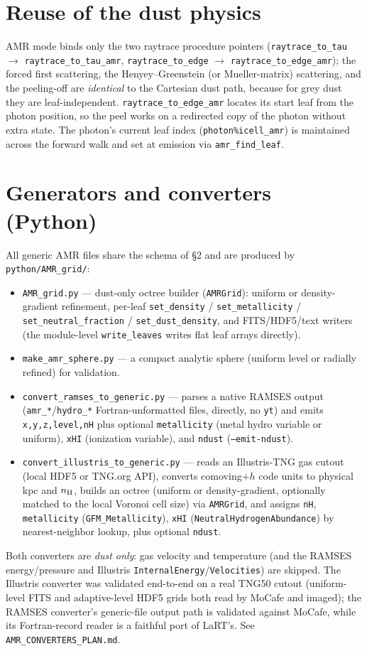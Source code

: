\documentclass[english,a4paper]{kiseon_memo}
\begin{document}
\section{Reuse of the dust physics}
AMR mode binds only the two raytrace procedure pointers
(\texttt{raytrace\_to\_tau} $\to$ \texttt{raytrace\_to\_tau\_amr},
\texttt{raytrace\_to\_edge} $\to$ \texttt{raytrace\_to\_edge\_amr}); the
forced first scattering, the Henyey--Greenstein (or Mueller-matrix)
scattering, and the peeling-off are \emph{identical} to the Cartesian dust
path, because for grey dust they are leaf-independent.
\texttt{raytrace\_to\_edge\_amr} locates its start leaf from the photon
position, so the peel works on a redirected copy of the photon without extra
state.  The photon's current leaf index (\texttt{photon\%icell\_amr}) is
maintained across the forward walk and set at emission via
\texttt{amr\_find\_leaf}.

\section{Generators and converters (Python)}
All generic AMR files share the schema of \S2 and are produced by
\texttt{python/AMR\_grid/}:
\begin{itemize}
\item \texttt{AMR\_grid.py} --- dust-only octree builder (\texttt{AMRGrid}):
  uniform or density-gradient refinement, per-leaf \texttt{set\_density} /
  \texttt{set\_metallicity} / \texttt{set\_neutral\_fraction} /
  \texttt{set\_dust\_density}, and FITS/HDF5/text writers (the module-level
  \texttt{write\_leaves} writes flat leaf arrays directly).
\item \texttt{make\_amr\_sphere.py} --- a compact analytic sphere (uniform
  level or radially refined) for validation.
\item \texttt{convert\_ramses\_to\_generic.py} --- parses a native RAMSES
  output (\texttt{amr\_*}/\texttt{hydro\_*} Fortran-unformatted files, directly,
  no \texttt{yt}) and emits \texttt{x,y,z,level,nH} plus optional
  \texttt{metallicity} (metal hydro variable or uniform), \texttt{xHI}
  (ionization variable), and \texttt{ndust} (\texttt{--emit-ndust}).
\item \texttt{convert\_illustris\_to\_generic.py} --- reads an Illustris-TNG
  gas cutout (local HDF5 or TNG.org API), converts comoving$+h$ code units to
  physical kpc and $n_{\rm H}$, builds an octree (uniform or density-gradient,
  optionally matched to the local Voronoi cell size) via \texttt{AMRGrid}, and
  assigns \texttt{nH}, \texttt{metallicity} (\texttt{GFM\_Metallicity}),
  \texttt{xHI} (\texttt{NeutralHydrogenAbundance}) by nearest-neighbor lookup,
  plus optional \texttt{ndust}.
\end{itemize}
Both converters are \emph{dust only}: gas velocity and temperature (and the
RAMSES energy/pressure and Illustris \texttt{InternalEnergy}/\texttt{Velocities})
are skipped.  The Illustris converter was validated end-to-end on a real TNG50
cutout (uniform-level FITS and adaptive-level HDF5 grids both read by MoCafe and
imaged); the RAMSES converter's generic-file output path is validated against
MoCafe, while its Fortran-record reader is a faithful port of LaRT's.  See
\texttt{AMR\_CONVERTERS\_PLAN.md}.
\end{document}
